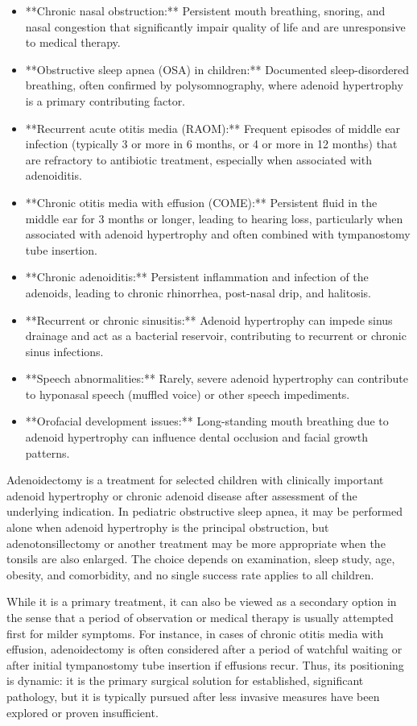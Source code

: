 \begin{itemize}
  \item **Chronic nasal obstruction:** Persistent mouth breathing, snoring, and nasal congestion that significantly impair quality of life and are unresponsive to medical therapy.
  \item **Obstructive sleep apnea (OSA) in children:** Documented sleep-disordered breathing, often confirmed by polysomnography, where adenoid hypertrophy is a primary contributing factor.
  \item **Recurrent acute otitis media (RAOM):** Frequent episodes of middle ear infection (typically 3 or more in 6 months, or 4 or more in 12 months) that are refractory to antibiotic treatment, especially when associated with adenoiditis.
  \item **Chronic otitis media with effusion (COME):** Persistent fluid in the middle ear for 3 months or longer, leading to hearing loss, particularly when associated with adenoid hypertrophy and often combined with tympanostomy tube insertion.
  \item **Chronic adenoiditis:** Persistent inflammation and infection of the adenoids, leading to chronic rhinorrhea, post-nasal drip, and halitosis.
  \item **Recurrent or chronic sinusitis:** Adenoid hypertrophy can impede sinus drainage and act as a bacterial reservoir, contributing to recurrent or chronic sinus infections.
  \item **Speech abnormalities:** Rarely, severe adenoid hypertrophy can contribute to hyponasal speech (muffled voice) or other speech impediments.
  \item **Orofacial development issues:** Long-standing mouth breathing due to adenoid hypertrophy can influence dental occlusion and facial growth patterns.
\end{itemize}

Adenoidectomy is a treatment for selected children with clinically important adenoid hypertrophy or chronic adenoid disease after assessment of the underlying indication. In pediatric obstructive sleep apnea, it may be performed alone when adenoid hypertrophy is the principal obstruction, but adenotonsillectomy or another treatment may be more appropriate when the tonsils are also enlarged. The choice depends on examination, sleep study, age, obesity, and comorbidity, and no single success rate applies to all children.

While it is a primary treatment, it can also be viewed as a secondary option in the sense that a period of observation or medical therapy is usually attempted first for milder symptoms. For instance, in cases of chronic otitis media with effusion, adenoidectomy is often considered after a period of watchful waiting or after initial tympanostomy tube insertion if effusions recur. Thus, its positioning is dynamic: it is the primary surgical solution for established, significant pathology, but it is typically pursued after less invasive measures have been explored or proven insufficient.

